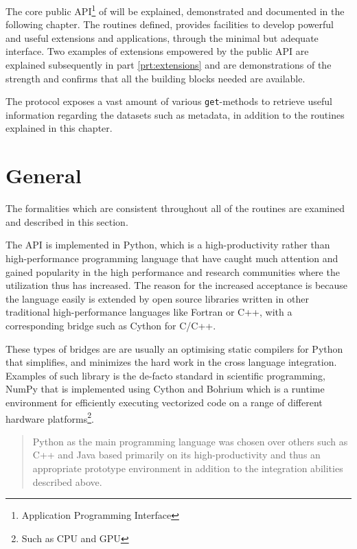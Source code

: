 The core public API\footnote{Application Programming Interface} of \CodeName will be explained, demonstrated and documented in the following chapter. The routines defined, provides facilities to develop powerful and useful extensions and applications, through the minimal but adequate interface. Two examples of extensions empowered by the public \CodeName API are explained subsequently in part \ref{prt:extensions} and are demonstrations of the strength and confirms that all the building blocks needed are available.
\newline

The protocol exposes a vast amount of various \texttt{get}-methods to retrieve useful information regarding the datasets such as metadata, in addition to the routines explained in this chapter.

\section{General}
The formalities which are consistent throughout all of the routines are examined and described in this section.

The API is implemented in Python\cite{PagePython}, which is a high-productivity rather than high-performance programming language that have caught much attention and gained popularity in the high performance and research communities where the utilization thus has increased. The reason for the increased acceptance is because the language easily is extended by open source libraries written in other traditional high-performance languages like Fortran or C++, with a corresponding bridge such as Cython\cite{PageCPython} for C/C++. 
\newline

These types of bridges are are usually an optimising static compilers for Python that simplifies, and minimizes the hard work in the cross language integration. Examples of such library is the de-facto standard in scientific programming, NumPy \cite{PageNumpy} \cite{oliphant2006guide} that is implemented using Cython and Bohrium \cite{PageBohrium} \cite{kristensen2013bohrium} which is a runtime environment for efficiently executing vectorized code on a range of different hardware platforms\footnote{Such as CPU and GPU}.

\begin{quotation}
Python as the main programming language was chosen over others such as C++ and Java based primarily on its high-productivity and thus an appropriate prototype environment in addition to the integration abilities described above.
\end{quotation}

